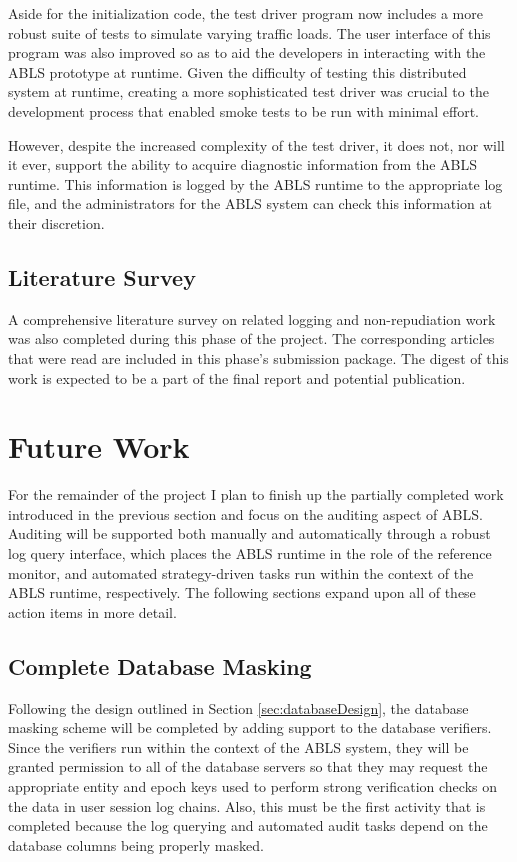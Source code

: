 \documentclass{sig-alternate}
\begin{document}
Aside for the initialization code, the test driver program now includes a more robust suite of tests to simulate varying traffic 
loads. The user interface of this program was also improved so as to aid the developers in interacting with the ABLS 
prototype at runtime. Given the difficulty of testing this distributed system at runtime, creating a more sophisticated
test driver was crucial to the development process that enabled smoke tests to be run with minimal effort.

However, despite the increased complexity of the test driver, it does not, nor will it ever, support the ability to acquire 
diagnostic information from the ABLS runtime. This information is logged by the ABLS runtime to the appropriate log 
file, and the administrators for the ABLS system can check this information at their discretion.

\subsection{Literature Survey}
A comprehensive literature survey on related logging and non-repudiation work was also completed during this phase 
of the project. The corresponding articles that were read are included in this phase's submission package. The digest of this work is expected to be a part of the final report and potential publication.

\section{Future Work}
For the remainder of the project I plan to finish up the partially completed work introduced in the previous section and 
focus on the auditing aspect of ABLS. Auditing will be supported both manually and automatically through
a robust log query interface, which places the ABLS runtime in the role of the reference monitor, and automated
strategy-driven tasks run within the context of the ABLS runtime, respectively. The following sections expand upon all
of these action items in more detail.

\subsection{Complete Database Masking}
Following the design outlined in Section \ref{sec:databaseDesign}, the database masking scheme will be completed by
adding support to the database verifiers. Since the verifiers run within the context of the ABLS system, they will be granted
permission to all of the database servers so that they may request the appropriate entity and epoch keys used to perform
strong verification checks on the data in user session log chains. Also, this must be the first activity that is completed 
because the log querying and automated audit tasks depend on the database columns being properly masked. 
\end{document}
